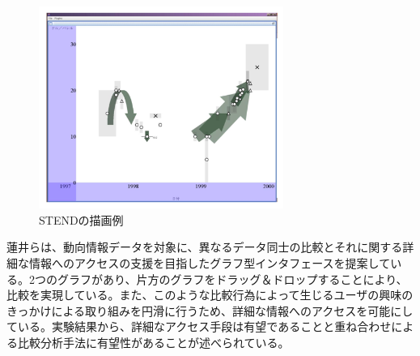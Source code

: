 \documentclass{matsushita-zemi}
\begin{document}
\begin{figure}[tb]
  \begin{center}
   \includegraphics[width=8cm,bb=0 0 512 422]{STEND.PNG}
  \end{center}
 \caption{STENDの描画例}
 \label{STEND}
\end{figure}

蓮井らは、動向情報データを対象に、異なるデータ同士の比較とそれに関する詳細な情報へのアクセスの支援を目指したグラフ型インタフェースを提案している\cite{比較}。2つのグラフがあり、片方のグラフをドラッグ＆ドロップすることにより、比較を実現している。また、このような比較行為によって生じるユーザの興味のきっかけによる取り組みを円滑に行うため、詳細な情報へのアクセスを可能にしている。実験結果から、詳細なアクセス手段は有望であることと重ね合わせによる比較分析手法に有望性があることが述べられている。
\end{document}
